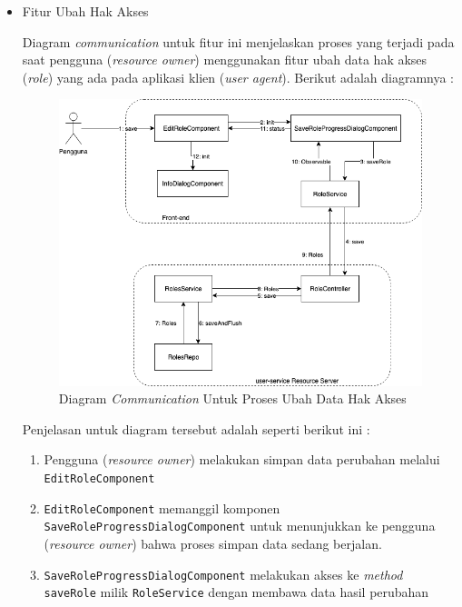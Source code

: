\documentclass[pdftex,12pt, oneside]{article}
\begin{document}
\begin{itemize}
	\item Fitur Ubah Hak Akses
	
	Diagram \textit{communication} untuk fitur ini menjelaskan proses yang terjadi pada saat pengguna (\textit{resource owner}) menggunakan fitur ubah data hak akses (\textit{role}) yang ada pada aplikasi klien (\textit{user agent}). Berikut adalah diagramnya :
	
	\begin{figure}[H]
		\centering
		\includegraphics[width=1\textwidth]{./resources/comm-dia-edit-role}
		\caption{Diagram \textit{Communication} Untuk Proses Ubah Data Hak Akses}
		\label{fig:comm-dia-edit-role}
	\end{figure}
	
	Penjelasan untuk diagram tersebut adalah seperti berikut ini :
	
	\begin{enumerate}
		\item Pengguna (\textit{resource owner}) melakukan simpan data perubahan melalui \texttt{EditRoleComponent}
		
		\item \texttt{EditRoleComponent} memanggil komponen \texttt{SaveRoleProgressDialogComponent} untuk menunjukkan ke pengguna (\textit{resource owner}) bahwa proses simpan data sedang berjalan.
		
		\item \texttt{SaveRoleProgressDialogComponent} melakukan akses ke \textit{method} \texttt{saveRole} milik \texttt{RoleService} dengan membawa data hasil perubahan
		

\end{enumerate}
\end{itemize}
\end{document}
